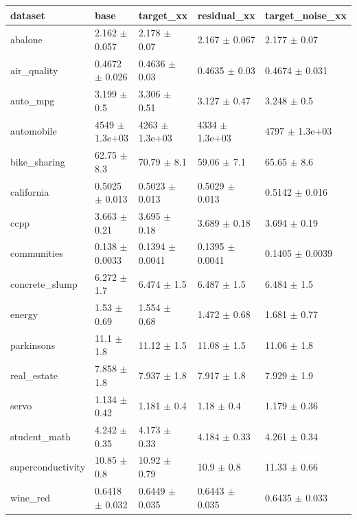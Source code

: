 \begin{tabular}{lllll}
\toprule
dataset & base & target\_xx & residual\_xx & target\_noise\_xx \\
\midrule
abalone & 2.162 $\pm$ 0.057 & 2.178 $\pm$ 0.07 & 2.167 $\pm$ 0.067 & 2.177 $\pm$ 0.07 \\
air\_quality & 0.4672 $\pm$ 0.026 & 0.4636 $\pm$ 0.03 & 0.4635 $\pm$ 0.03 & 0.4674 $\pm$ 0.031 \\
auto\_mpg & 3.199 $\pm$ 0.5 & 3.306 $\pm$ 0.51 & 3.127 $\pm$ 0.47 & 3.248 $\pm$ 0.5 \\
automobile & 4549 $\pm$ 1.3e+03 & 4263 $\pm$ 1.3e+03 & 4334 $\pm$ 1.3e+03 & 4797 $\pm$ 1.3e+03 \\
bike\_sharing & 62.75 $\pm$ 8.3 & 70.79 $\pm$ 8.1 & 59.06 $\pm$ 7.1 & 65.65 $\pm$ 8.6 \\
california & 0.5025 $\pm$ 0.013 & 0.5023 $\pm$ 0.013 & 0.5029 $\pm$ 0.013 & 0.5142 $\pm$ 0.016 \\
ccpp & 3.663 $\pm$ 0.21 & 3.695 $\pm$ 0.18 & 3.689 $\pm$ 0.18 & 3.694 $\pm$ 0.19 \\
communities & 0.138 $\pm$ 0.0033 & 0.1394 $\pm$ 0.0041 & 0.1395 $\pm$ 0.0041 & 0.1405 $\pm$ 0.0039 \\
concrete\_slump & 6.272 $\pm$ 1.7 & 6.474 $\pm$ 1.5 & 6.487 $\pm$ 1.5 & 6.484 $\pm$ 1.5 \\
energy & 1.53 $\pm$ 0.69 & 1.554 $\pm$ 0.68 & 1.472 $\pm$ 0.68 & 1.681 $\pm$ 0.77 \\
parkinsons & 11.1 $\pm$ 1.8 & 11.12 $\pm$ 1.5 & 11.08 $\pm$ 1.5 & 11.06 $\pm$ 1.8 \\
real\_estate & 7.858 $\pm$ 1.8 & 7.937 $\pm$ 1.8 & 7.917 $\pm$ 1.8 & 7.929 $\pm$ 1.9 \\
servo & 1.134 $\pm$ 0.42 & 1.181 $\pm$ 0.4 & 1.18 $\pm$ 0.4 & 1.179 $\pm$ 0.36 \\
student\_math & 4.242 $\pm$ 0.35 & 4.173 $\pm$ 0.33 & 4.184 $\pm$ 0.33 & 4.261 $\pm$ 0.34 \\
superconductivity & 10.85 $\pm$ 0.8 & 10.92 $\pm$ 0.79 & 10.9 $\pm$ 0.8 & 11.33 $\pm$ 0.66 \\
wine\_red & 0.6418 $\pm$ 0.032 & 0.6449 $\pm$ 0.035 & 0.6443 $\pm$ 0.035 & 0.6435 $\pm$ 0.033 \\
\bottomrule
\end{tabular}
